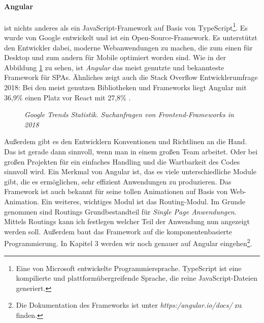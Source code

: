 \paragraph{Angular}
\label{p:angular}
%
ist nichts anderes als ein JavaScript-Framework auf Basis von TypeScript\footnote{Eine von Microsoft entwickelte Programmiersprache. TypeScript ist eine kompilierte und plattformübergreifende Sprache, die reine JavaScript-Dateien generiert.}. Es wurde von Google entwickelt und ist ein Open-Source-Framework. Es unterstützt den Entwickler dabei, moderne Webanwendungen zu machen, die zum einen für Desktop und zum andern für Mobile optimiert worden sind. Wie in der Abbildung \ref{fig:googletrends} zu sehen, ist \textit{Angular} das meist genutzte und bekannteste Framework für SPAs. Ähnliches zeigt auch die Stack Overflow Entwicklerumfrage 2018: Bei den meist genutzen Bibliotheken und Frameworks liegt Angular mit 36,9\% einen Platz vor React mit 27,8\% \cite{stackoverflow_stack_2018}.
%
\begin{figure}[h]
	\centering
	{}
	\caption[Google Trends Statistik Frameworks]{\textit{Google Trends Statistik. Suchanfragen von Frontend-Frameworks in 2018}}
	\label{fig:googletrends}
\end{figure}
%
Außerdem gibt es den Entwicklern Konventionen und Richtlinen an die Hand. Das ist gerade dann sinnvoll, wenn man in einem großen Team arbeitet. Oder bei großen Projekten für ein einfaches Handling und die Wartbarkeit des Codes sinnvoll wird. Ein Merkmal von Angular ist, das es viele unterschiedliche Module gibt, die es ermöglichen, sehr effizient Anwendungen zu produzieren. Das Framework ist auch bekannt für seine tollen Animationen auf Basis von Web-Animation. Ein weiteres, wichtiges Modul ist das Routing-Modul. Im Grunde genommen sind Routings Grundbestandteil für \textit{Single Page Anwendungen}. Mittels Routings kann ich festlegen welcher Teil der Anwendung nun angezeigt werden soll. Außerdem baut das Framework auf die komponentenbasierte Programmierung. In Kapitel 3 werden wir noch genauer auf Angular eingehen\footnote{Die Dokumentation des Frameworks ist unter \textit{https:/angular.io/docs/} zu finden.}.
%

%
